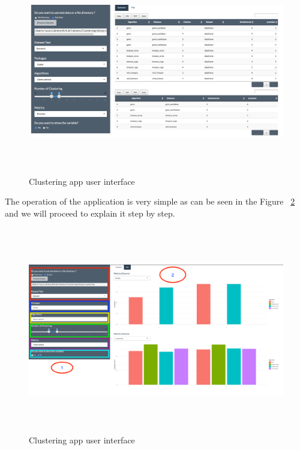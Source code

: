 \begin{figure}[htbp]
  \centering
   \includegraphics[width=14cm, height=9cm]{img/app}
    \caption{Clustering app user interface}
    \label{fig:layoutApp}%
\end{figure}

The operation of the application is very simple as can be seen in the Figure ~\ref{fig:layoutApp1} and we will proceed to explain it step by step.

\begin{figure}[htbp]
  \centering
   \includegraphics[width=14cm, height=9cm]{img/app1}
    \caption{Clustering app user interface}
    \label{fig:layoutApp1}%
\end{figure}

